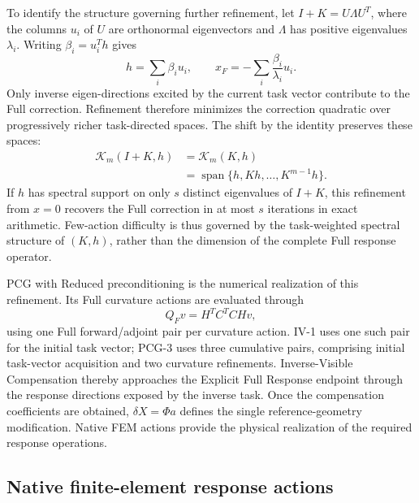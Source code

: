 To identify the structure governing further refinement, let \(I+K=U\Lambda U^T\), where the columns \(u_i\) of \(U\) are orthonormal eigenvectors and \(\Lambda\) has positive eigenvalues \(\lambda_i\). Writing \(\beta_i=u_i^Th\) gives
\begin{equation}
h=\sum_i\beta_i u_i,
\qquad
x_F=-\sum_i\frac{\beta_i}{\lambda_i}u_i.
\label{eq:task_weighted_spectrum}
\end{equation}
Only inverse eigen-directions excited by the current task vector contribute to the Full correction. Refinement therefore minimizes the correction quadratic over progressively richer task-directed spaces. The shift by the identity preserves these spaces:
\begin{equation}
\begin{aligned}
\mathcal K_m(I+K,h)
&=\mathcal K_m(K,h)\\
&=\operatorname{span}\{h,Kh,\ldots,K^{m-1}h\}.
\end{aligned}
\label{eq:krylov_structure}
\end{equation}
If \(h\) has spectral support on only \(s\) distinct eigenvalues of \(I+K\), this refinement from \(x=0\) recovers the Full correction in at most \(s\) iterations in exact arithmetic. Few-action difficulty is thus governed by the task-weighted spectral structure of \((K,h)\), rather than the dimension of the complete Full response operator.

PCG with Reduced preconditioning is the numerical realization of this refinement. Its Full curvature actions are evaluated through
\[
Q_Fv=H^TC^TCHv,
\]
using one Full forward/adjoint pair per curvature action. IV-1 uses one such pair for the initial task vector; PCG-3 uses three cumulative pairs, comprising initial task-vector acquisition and two curvature refinements. Inverse-Visible Compensation thereby approaches the Explicit Full Response endpoint through the response directions exposed by the inverse task. Once the compensation coefficients are obtained, \(\delta X=\Phi a\) defines the single reference-geometry modification. Native FEM actions provide the physical realization of the required response operations.

\subsection{Native finite-element response actions}
\label{sec:native_fem_response_actions}

